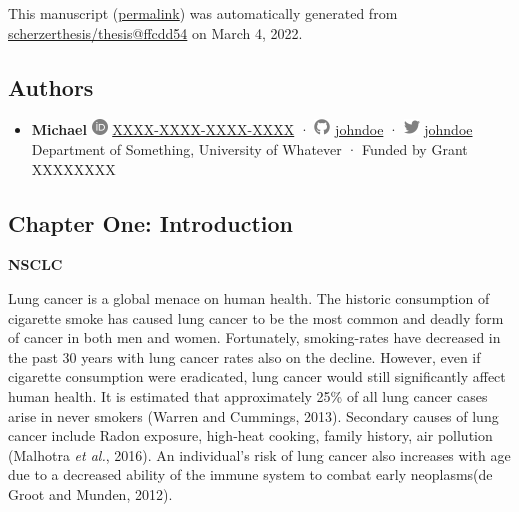 This manuscript
(\href{https://scherzerthesis.github.io/thesis/v/ffcdd549f7ffe6f12407e950146e88869af4f04d/}{permalink})
was automatically generated
from \href{https://github.com/scherzerthesis/thesis/tree/ffcdd549f7ffe6f12407e950146e88869af4f04d}{scherzerthesis/thesis@ffcdd54}
on March 4, 2022.

\hypertarget{authors}{%
\subsection{Authors}\label{authors}}

\begin{itemize}
\tightlist
\item
  \textbf{Michael}
  \includegraphics[width=0.16667in,height=0.16667in]{images/orcid.svg}
  \href{https://orcid.org/XXXX-XXXX-XXXX-XXXX}{XXXX-XXXX-XXXX-XXXX}
  · \includegraphics[width=0.16667in,height=0.16667in]{images/github.svg}
  \href{https://github.com/johndoe}{johndoe}
  · \includegraphics[width=0.16667in,height=0.16667in]{images/twitter.svg}
  \href{https://twitter.com/johndoe}{johndoe}
  Department of Something, University of Whatever
  · Funded by Grant XXXXXXXX
\end{itemize}

\hypertarget{chapter-one-introduction}{%
\subsection{Chapter One: Introduction}\label{chapter-one-introduction}}

\textbf{NSCLC}

Lung cancer is a global menace on human health. The historic consumption of cigarette smoke has caused lung cancer to be the most common and deadly form of cancer in both men and women. Fortunately, smoking-rates have decreased in the past 30 years with lung cancer rates also on the decline. However, even if cigarette consumption were eradicated, lung cancer would still significantly affect human health. It is estimated that approximately 25\% of all lung cancer cases arise in never smokers (Warren and Cummings, 2013). Secondary causes of lung cancer include Radon exposure, high-heat cooking, family history, air pollution (Malhotra \emph{et al.}, 2016). An individual's risk of lung cancer also increases with age due to a decreased ability of the immune system to combat early neoplasms(de Groot and Munden, 2012).


